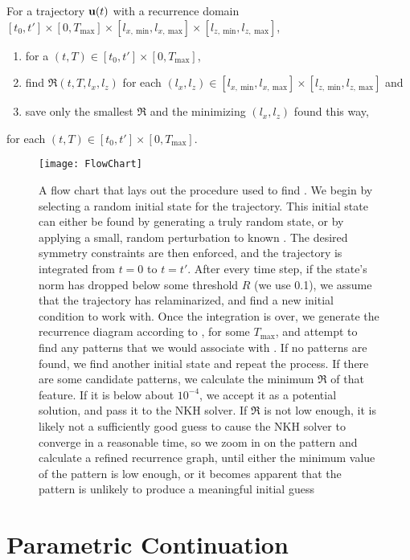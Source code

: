 \begin{algorithm}\label{alg:recBroke}
For a trajectory $\mathbf{u}(t)$ with a recurrence domain   $[t_0,t']\times [0,T_{\textrm{max}}] \times [l_{x,~\textrm{min}},l_{x,~\textrm{max}}] \times [l_{z,~\textrm{min}},l_{z,~\textrm{max}}]$, 
\begin{enumerate}
\item for a $(t,T) \in [t_0,t']\times [0,T_{\textrm{max}}]$, 
\item find $\mathfrak{R}(t,T,l_x,l_z)$ for each $(l_x,l_z) \in  [l_{x,~\textrm{min}},l_{x,~\textrm{max}}] \times [l_{z,~\textrm{min}},l_{z,~\textrm{max}}]$ and 
\item save only the smallest $\mathfrak{R}$ and the minimizing $(l_x,l_z)$ found this way,   
\end{enumerate}
 for each $(t,T) \in [t_0,t']\times [0,T_{\textrm{max}}]$.
\end{algorithm}

\begin{figure}[h!]
\texttt{[image: FlowChart]}
\caption{A flow chart that lays out the procedure used to find \ecs. We begin by selecting a random initial state for the trajectory. This initial state can either be found by generating a truly random state, or by applying a small, random perturbation to known \ecs. The desired symmetry constraints are then enforced, and the trajectory is integrated from $t = 0$ to $t=t'$. After every time step, if the state's norm has dropped below some threshold $R$ (we use 0.1), we assume that the trajectory has relaminarized, and find a new initial condition to work with. Once the integration is over, we generate the recurrence diagram according to , for some $T_{\textrm{max}}$, and attempt to find any patterns that we would associate with \ecs. If no patterns are found, we find another initial state and repeat the process. If there are some candidate patterns, we calculate the minimum $\mathfrak{R}$ of that feature. If it is below about $10^{-4}$, we accept it as a potential solution, and pass it to the NKH solver. If $\mathfrak{R}$ is not low enough, it is likely not a sufficiently good guess to cause the NKH solver to converge in a reasonable time, so we zoom in on the pattern and calculate a refined recurrence graph, until either the minimum value of the pattern is low enough, or it becomes apparent that the pattern is unlikely to produce a meaningful initial guess}\label{fig:FlowChart} 
\end{figure}
 \clearpage
 \section{Parametric Continuation} 
 

